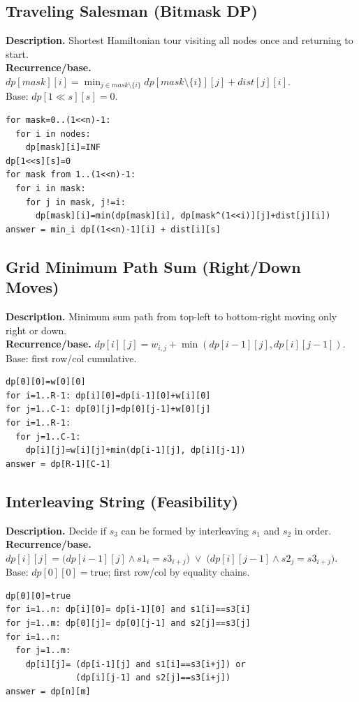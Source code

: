 \documentclass[9pt]{extarticle}
\begin{document}
\subsection{Traveling Salesman (Bitmask DP)}
\textbf{Description.} Shortest Hamiltonian tour visiting all nodes once and returning to start.\\
\textbf{Recurrence/base.} \(dp[mask][i]=\min_{j \in mask\setminus\{i\}} dp[mask\setminus\{i\}][j]+dist[j][i]\).  \\
Base: \(dp[1\ll s][s]=0\).
\begin{verbatim}
for mask=0..(1<<n)-1:
  for i in nodes:
    dp[mask][i]=INF
dp[1<<s][s]=0
for mask from 1..(1<<n)-1:
  for i in mask:
    for j in mask, j!=i:
      dp[mask][i]=min(dp[mask][i], dp[mask^(1<<i)][j]+dist[j][i])
answer = min_i dp[(1<<n)-1][i] + dist[i][s]
\end{verbatim}

\subsection{Grid Minimum Path Sum (Right/Down Moves)}
\textbf{Description.} Minimum sum path from top-left to bottom-right moving only right or down.\\
\textbf{Recurrence/base.} \(dp[i][j]=w_{i,j}+\min(dp[i-1][j],dp[i][j-1])\).  \\
Base: first row/col cumulative.
\begin{verbatim}
dp[0][0]=w[0][0]
for i=1..R-1: dp[i][0]=dp[i-1][0]+w[i][0]
for j=1..C-1: dp[0][j]=dp[0][j-1]+w[0][j]
for i=1..R-1:
  for j=1..C-1:
    dp[i][j]=w[i][j]+min(dp[i-1][j], dp[i][j-1])
answer = dp[R-1][C-1]
\end{verbatim}

\subsection{Interleaving String (Feasibility)}
\textbf{Description.} Decide if \(s_3\) can be formed by interleaving \(s_1\) and \(s_2\) in order.\\
\textbf{Recurrence/base.} \(dp[i][j]=\big( dp[i-1][j]\land s1_i=s3_{i+j}\big)\;\lor\;\big( dp[i][j-1]\land s2_j=s3_{i+j}\big)\).  \\
Base: \(dp[0][0]=\text{true}\); first row/col by equality chains.
\begin{verbatim}
dp[0][0]=true
for i=1..n: dp[i][0]= dp[i-1][0] and s1[i]==s3[i]
for j=1..m: dp[0][j]= dp[0][j-1] and s2[j]==s3[j]
for i=1..n:
  for j=1..m:
    dp[i][j]= (dp[i-1][j] and s1[i]==s3[i+j]) or
              (dp[i][j-1] and s2[j]==s3[i+j])
answer = dp[n][m]
\end{verbatim}
\end{document}
